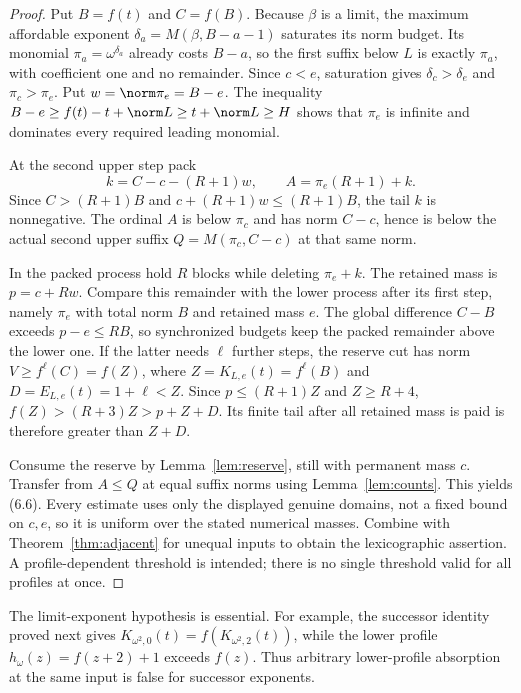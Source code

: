 \documentclass[11pt,a4paper]{article}
\newcommand{\KK}[2]{K_{#1,#2}}
\newcommand{\EE}[2]{E_{#1,#2}}
\begin{document}
\begin{proof}
Put $B=f(t)$ and $C=f(B)$. Because $\beta$ is a limit, the maximum
affordable exponent $\delta_a=M(\beta,B-a-1)$ saturates its norm budget.
Its monomial $\pi_a=\omega^{\delta_a}$ already costs $B-a$, so the first
suffix below $L$ is exactly $\pi_a$, with coefficient one and no remainder.
Since $c<e$, saturation gives $\delta_c>\delta_e$ and $\pi_c>\pi_e$.
Put $w=\norm\pi_e=B-e$. The inequality
$B-e\ge f(t)-t+\norm L\ge t+\norm L\ge H$ shows that $\pi_e$ is
infinite and dominates every required leading monomial.

At the second upper step pack
\[
       k=C-c-(R+1)w,\qquad A=\pi_e(R+1)+k.
\]
Since $C>(R+1)B$ and $c+(R+1)w\le(R+1)B$, the tail $k$ is nonnegative.
The ordinal $A$ is below $\pi_c$ and has norm $C-c$, hence is below the
actual second upper suffix $Q=M(\pi_c,C-c)$ at that same norm.

In the packed process hold $R$ blocks while deleting $\pi_e+k$.
The retained mass is $p=c+Rw$. Compare this remainder with the lower
process after its first step, namely $\pi_e$ with total norm $B$ and
retained mass $e$. The global difference $C-B$ exceeds $p-e\le RB$,
so synchronized budgets keep the packed remainder above the lower one.
If the latter needs $\ell$ further steps, the reserve cut has norm
$V\ge f^\ell(C)=f(Z)$, where $Z=\KK Le(t)=f^\ell(B)$ and
$D=\EE Le(t)=1+\ell<Z$. Since $p\le(R+1)Z$ and $Z\ge R+4$,
$f(Z)>(R+3)Z>p+Z+D$. Its finite tail after all retained mass is paid
is therefore greater than $Z+D$.

Consume the reserve by Lemma~\ref{lem:reserve}, still with permanent mass
$c$. Transfer from $A\le Q$ at equal suffix norms using
Lemma~\ref{lem:counts}. This yields (6.6). Every estimate uses only the
displayed genuine domains, not a fixed bound on $c,e$, so it is uniform
over the stated numerical masses. Combine with
Theorem~\ref{thm:adjacent} for unequal inputs to obtain the lexicographic
assertion. A profile-dependent threshold is intended; there is no single
threshold valid for all profiles at once.
\end{proof}
The limit-exponent hypothesis is essential. For example, the successor
identity proved next gives
$\KK{\omega^2}0(t)=f(\KK{\omega^2}2(t))$, while the lower profile
$h_\omega(z)=f(z+2)+1$ exceeds $f(z)$. Thus arbitrary lower-profile
absorption at the same input is false for successor exponents.
\end{document}
